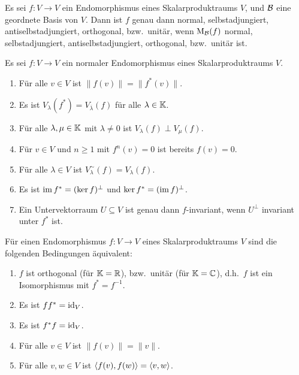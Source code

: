 \begin{proposition}
  Es sei $f \colon V \to V$ ein Endomorphismus eines Skalarproduktraums $V$, und $\mathcal{B}$ eine geordnete Basis von $V$.
  Dann ist $f$ genau dann normal, selbstadjungiert, antiselbstadjungiert, orthogonal, bzw.\ unitär, wenn $\mathrm{M}_{\mathcal{B}}(f)$ normal, selbstadjungiert, antiselbstadjungiert, orthogonal, bzw.\ unitär ist.
\end{proposition}


\begin{proposition}
  Es sei $f \colon V \to V$ ein normaler Endomorphismus eines Skalarproduktraums $V$.
  \begin{enumerate}[leftmargin=*, label=\roman*)]
    \item
      Für alle $v \in V$ ist $\|f(v)\| = \|f^*(v)\|$.
    \item
      Es ist $V_\lambda(f^*) = V_{\overline{\lambda}}(f)$ für alle $\lambda \in \mathbb{K}$.
    \item
      Für alle $\lambda, \mu \in \mathbb{K}$ mit $\lambda \neq 0$ ist $V_\lambda(f) \perp V_\mu(f)$.
    \item
      Für $v \in V$ und $n \geq 1$ mit $f^n(v) = 0$ ist bereits $f(v) = 0$.
    \item
      Für alle $\lambda \in V$ ist $V^\sim_\lambda(f) = V_\lambda(f)$.
    \item
      Es ist $\operatorname{im} f^* = (\ker f)^\perp$ und $\ker f^* = (\operatorname{im} f)^\perp$.
    \item
      Ein Untervektorraum $U \subseteq V$ ist genau dann $f$-invariant, wenn $U^\perp$ invariant unter $f^*$ ist.
  \end{enumerate}
\end{proposition}


\begin{proposition}
  Für einen Endomorphismus $f \colon V \to V$ eines Skalarproduktraums $V$ sind die folgenden Bedingungen äquivalent:
  \begin{enumerate}[leftmargin=*, label=\roman*)]
    \item
      $f$ ist orthogonal (für $\mathbb{K} = \mathbb{R}$), bzw.\ unitär (für $\mathbb{K} = \mathbb{C}$), d.h.\ $f$ ist ein Isomorphismus mit $f^* = f^{-1}$.
    \item
      Es ist $f f^* = \operatorname{id}_V$.
    \item
      Es ist $f^* f = \operatorname{id}_V$.
    \item
      Für alle $v \in V$ ist $\|f(v)\| = \|v\|$.
    \item
      Für alle $v, w \in V$ ist $\left\langle f(v), f(w) \right\rangle = \left\langle v,w \right\rangle$.
  \end{enumerate}
\end{proposition}


